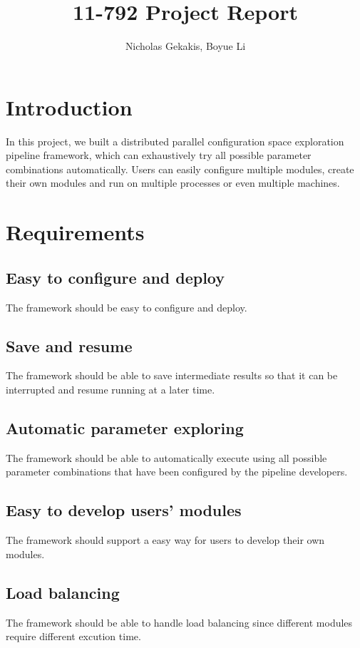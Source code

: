 \documentclass{article}
\begin{document}
\title{11-792 Project Report}

\author{Nicholas Gekakis, Boyue Li}

\maketitle

\section{Introduction}

In this project, we built a distributed parallel configuration space exploration pipeline framework,
which can exhaustively try all possible parameter combinations automatically.
Users can easily configure multiple modules,
create their own modules and run on multiple processes or even multiple machines.

\section{Requirements}

    \subsection{Easy to configure and deploy}
    The framework should be easy to configure and deploy.

    \subsection{Save and resume}
    The framework should be able to save intermediate results so that it can be interrupted and resume running at a later time.

    \subsection{Automatic parameter exploring}
    The framework should be able to automatically execute using all possible parameter combinations that have been configured by the pipeline developers.

    \subsection{Easy to develop users' modules}
    The framework should support a easy way for users to develop their own modules.

    \subsection{Load balancing}
    The framework should be able to handle load balancing since different modules require different excution time.
\end{document}

